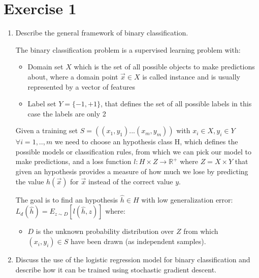 \documentclass[a4paper,11pt,oneside]{book}
\begin{document}
\section{Exercise 1}
\begin{enumerate}
\item Describe the general framework of binary classification.
    \begin{solution}
        The binary classification problem is a supervised learning problem with:
        
        \begin{itemize}
        \item Domain set $X$ which is the set of all possible objects to make predictions about, where a domain point $\vec{x} \in X$ is called instance and is usually represented by a vector of features
        
        \item Label set $Y = \{-1,+1\}$, that defines the set of all possible labels in this case the labels are only 2
        \end{itemize}
        
        Given a training set $S = ((x_1, y_1) ... (x_m, y_m))$ with $x_i \in X, y_i \in Y$ $\forall i = 1,..,m$ we need to choose an hypothesis class H, which defines the possible models or classification rules, from which we can pick our model to make predictions, and a loss function $l: H \times Z \to \mathbb{R}^+$ where $Z = X \times Y$ that given an hypothesis provides a measure of how much we lose by predicting the value $h(\vec{x})$ for $\vec{x}$ instead of the correct value $y$.
        
        The goal is to find an hypothesis $\hat{h} \in H$ with low generalization error: $L_d(\hat{h}) = E_{z\sim D}[l(\hat{h},z)]$ where:
        
        \begin{itemize}
        \item $D$ is the unknown probability distribution over $Z$ from which $(x_i, y_i) \in S$ have been drawn (as independent samples).
        \end{itemize}
    \end{solution}

\item Discuss the use of the logistic regression model for binary classification and describe how it can be trained using stochastic gradient descent.
\end{enumerate}

\clearpage
\end{document}
